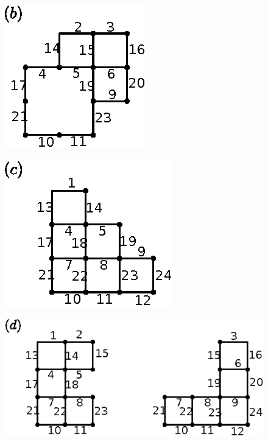 \begin{enumerate}
\begin{minipage}[c]{5cm}
\begin{figure}[H]
\hspace{4cm}
\end{figure}
\end{minipage}

\begin{minipage}[c]{4cm}
\begin{figure}[H]
\centering
\includegraphics{images/chap11/ans8b.eps}

\hspace{4cm}
\end{figure}
\end{minipage}
\qquad
\begin{minipage}[c]{5cm}
\begin{figure}[H]
\centering
\includegraphics{images/chap11/ans8c.eps}

\hspace{4cm}
\end{figure}
\end{minipage}


\begin{figure}[H]
\centering
\includegraphics[scale=1.1]{images/chap11/ans8d.eps}


\end{figure}
\end{enumerate}
